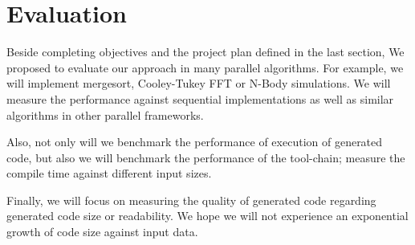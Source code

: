 \chapter{Evaluation}
Beside completing objectives and the project plan defined in the last section, We proposed to evaluate our approach in many parallel algorithms. For example, we will implement mergesort, Cooley-Tukey FFT or N-Body simulations. We will measure the performance against sequential implementations as well as similar algorithms in other parallel frameworks. 

Also, not only will we benchmark the performance of execution of generated code, but also we will benchmark the performance of the tool-chain; \eg measure the compile time against different input sizes. 

Finally, we will focus on measuring the quality of generated code regarding generated code size or readability. We hope we will not experience an exponential growth of code size against input data.